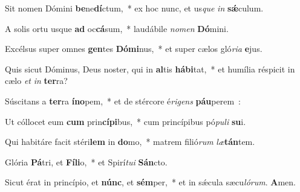 ﻿\item Sit nomen Dómini \textbf{be}ne\textbf{dí}ctum,~* ex hoc nunc, et us\emph{que} \emph{in} \textbf{sǽ}culum.
\item A solis ortu usque \textbf{ad} oc\textbf{cá}sum,~* laudábile \emph{no}\emph{men} \textbf{Dó}mini.
\item Excélsus super omnes \textbf{gen}tes \textbf{Dó}\textbf{mi}nus,~* et super cælos gló\emph{ri}\emph{a} \textbf{e}jus.
\item Quis sicut Dóminus, Deus noster, qui in \textbf{al}tis \textbf{há}\textbf{bi}tat,~* et humília réspicit in cælo \emph{et} \emph{in} \textbf{ter}ra?
\item Súscitans a \textbf{ter}ra \textbf{ín}\textbf{o}pem,~* et de stércore é\emph{ri}\emph{gens} \textbf{páu}perem~:
\item Ut cóllocet eum \textbf{cum} prin\textbf{cí}\textbf{pi}bus,~* cum princípibus pó\emph{pu}\emph{li} \textbf{su}i.
\item Qui habitáre facit stéri\textbf{lem} in \textbf{do}mo,~* matrem filió\emph{rum} \emph{læ}\textbf{tán}tem.
\item Glória \textbf{Pá}tri, et \textbf{Fí}\textbf{li}o,~* et Spirí\emph{tu}\emph{i} \textbf{Sán}cto.
\item Sicut érat in princípio, et \textbf{núnc}, et \textbf{sém}per,~* et in sǽcula sæcu\emph{ló}\emph{rum}. \textbf{A}men.